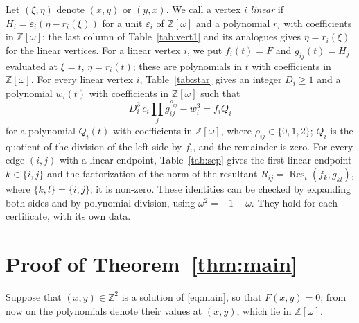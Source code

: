 \documentclass[11pt]{article}
\newcommand{\Z}{\mathbb{Z}}
\begin{document}
Let $(\xi,\eta)$ denote $(x,y)$ or $(y,x)$. We call a vertex $i$ \emph{linear} if $H_i=\varepsilon_i(\eta-r_i(\xi))$ for a unit $\varepsilon_i$ of $\Z[\omega]$ and a polynomial $r_i$ with coefficients in $\Z[\omega]$; the last column of Table~\ref{tab:vert1} and its analogues gives $\eta=r_i(\xi)$ for the linear vertices. For a linear vertex $i$, we put $f_i(t)=F$ and $g_{ij}(t)=H_j$ evaluated at $\xi=t$, $\eta=r_i(t)$; these are polynomials in $t$ with coefficients in $\Z[\omega]$.
For every linear vertex $i$, Table~\ref{tab:star} gives an integer $D_i\geq1$ and a polynomial $w_i(t)$ with coefficients in $\Z[\omega]$ such that
\begin{equation}\label{eq:starlin}
D_i^3\,c_i\prod_jg_{ij}^{\rho_{ij}}-w_i^3=f_iQ_i
\end{equation}
for a polynomial $Q_i(t)$ with coefficients in $\Z[\omega]$, where $\rho_{ij}\in\{0,1,2\}$; $Q_i$ is the quotient of the division of the left side by $f_i$, and the remainder is zero.
For every edge $(i,j)$ with a linear endpoint, Table~\ref{tab:sep} gives the first linear endpoint $k\in\{i,j\}$ and the factorization of the norm of the resultant $R_{ij}=\operatorname{Res}_t(f_k,g_{kl})$, where $\{k,l\}=\{i,j\}$; it is non-zero.
These identities can be checked by expanding both sides and by polynomial division, using $\omega^2=-1-\omega$. They hold for each certificate, with its own data.

\section{Proof of Theorem~\ref{thm:main}}

Suppose that $(x,y)\in\Z^2$ is a solution of \eqref{eq:main}, so that $F(x,y)=0$; from now on the polynomials denote their values at $(x,y)$, which lie in $\Z[\omega]$.
\end{document}
